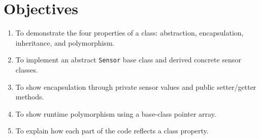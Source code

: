 \section{Objectives}
\begin{enumerate}
  \item To demonstrate the four properties of a class: abstraction, encapsulation, inheritance, and polymorphism.
  \item To implement an abstract \texttt{Sensor} base class and derived concrete sensor classes.
  \item To show encapsulation through private sensor values and public setter/getter methods.
  \item To show runtime polymorphism using a base-class pointer array.
  \item To explain how each part of the code reflects a class property.
\end{enumerate}
